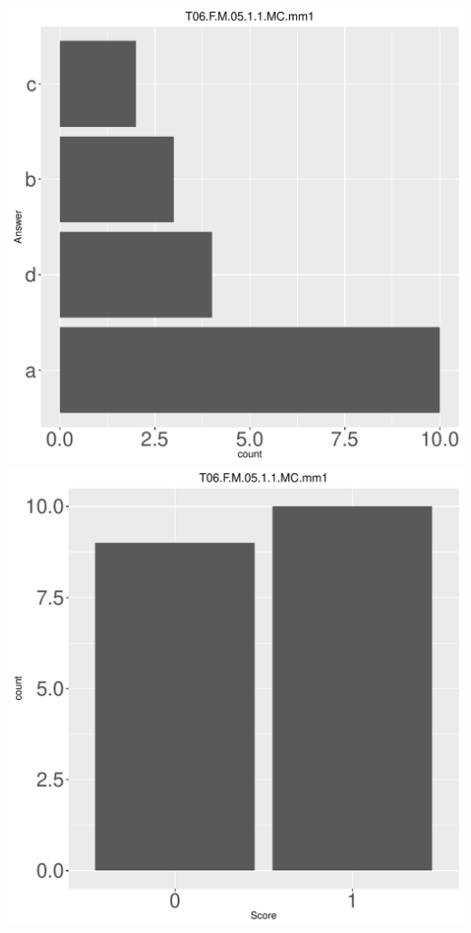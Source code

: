 \documentclass[12pt,english,nohyper]{tufte-handout}\usepackage[]{graphicx}\usepackage[]{color}
\begin{document}
\begin{center} \includegraphics[width=.45\linewidth]{Topic06_AB_45_answer} \includegraphics[width=.45\linewidth]{Topic06_AB_45_score} \end{center} 
\end{document}
